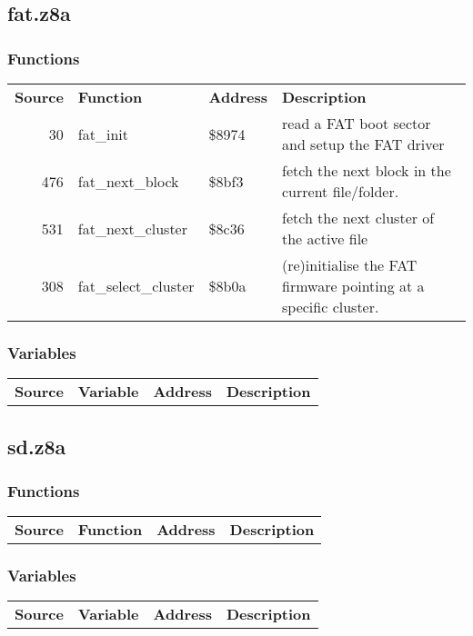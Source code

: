 \subsection{fat.z8a}
\subsubsection{Functions}
\begin{tabular}{rllp{7cm}}
 \textbf{Source}&\textbf{Function}&\textbf{Address}&\textbf{Description}\\
 30&fat\_init&\$8974&read a FAT boot sector and setup the FAT driver\\
 476&fat\_next\_block&\$8bf3&fetch the next block in the current file/folder.\\
 531&fat\_next\_cluster&\$8c36&fetch the next cluster of the active file\\
 308&fat\_select\_cluster&\$8b0a&(re)initialise the FAT firmware pointing at a specific cluster.\\
\end{tabular}

\subsubsection{Variables}
\begin{tabular}{rllp{7cm}}
 \textbf{Source}&\textbf{Variable}&\textbf{Address}&\textbf{Description}\\
\end{tabular}

\subsection{sd.z8a}
\subsubsection{Functions}
\begin{tabular}{rllp{7cm}}
 \textbf{Source}&\textbf{Function}&\textbf{Address}&\textbf{Description}\\
\end{tabular}

\subsubsection{Variables}
\begin{tabular}{rllp{7cm}}
 \textbf{Source}&\textbf{Variable}&\textbf{Address}&\textbf{Description}\\
\end{tabular}

